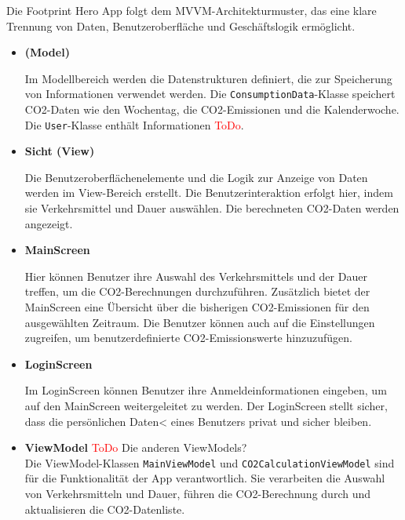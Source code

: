 \documentclass{article}
\begin{document}
Die Footprint Hero App folgt dem MVVM-Architekturmuster, das eine klare Trennung von Daten, Benutzeroberfläche und Geschäftslogik ermöglicht.
\begin{itemize}
\item \textbf{(Model)}

Im Modellbereich werden die Datenstrukturen definiert, die zur Speicherung von Informationen verwendet werden. Die \texttt{ConsumptionData}-Klasse speichert CO2-Daten wie den Wochentag, die CO2-Emissionen und die Kalenderwoche. Die \texttt{User}-Klasse enthält Informationen \textcolor{red}{ToDo}.

\item \textbf{Sicht (View)}

Die Benutzeroberflächenelemente und die Logik zur Anzeige von Daten werden im View-Bereich erstellt. Die Benutzerinteraktion erfolgt hier, indem sie Verkehrsmittel und Dauer auswählen. Die berechneten CO2-Daten werden angezeigt.

\item \textbf{MainScreen}

Hier können Benutzer ihre Auswahl des Verkehrsmittels und der Dauer treffen, um die CO2-Berechnungen durchzuführen. Zusätzlich bietet der MainScreen eine Übersicht über die bisherigen CO2-Emissionen für den ausgewählten Zeitraum. Die Benutzer können auch auf die Einstellungen zugreifen, um benutzerdefinierte CO2-Emissionswerte hinzuzufügen.


\item \textbf{LoginScreen}

Im LoginScreen können Benutzer ihre Anmeldeinformationen eingeben, um auf den MainScreen weitergeleitet zu werden. Der LoginScreen stellt sicher, dass die persönlichen Daten< eines Benutzers privat und sicher bleiben.


\item \textbf{ViewModel}
\textcolor{red}{ToDo} Die anderen ViewModels?\\
Die ViewModel-Klassen \texttt{MainViewModel} und \texttt{CO2CalculationViewModel} sind für die Funktionalität der App verantwortlich. Sie verarbeiten die Auswahl von Verkehrsmitteln und Dauer, führen die CO2-Berechnung durch und aktualisieren die CO2-Datenliste.
\end{itemize}
\end{document}
